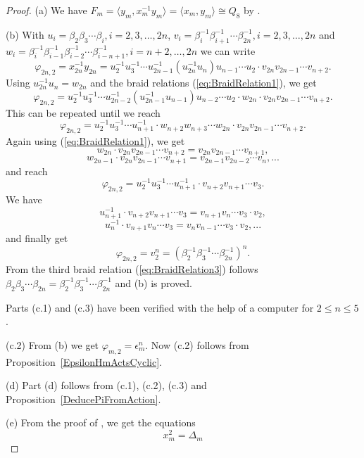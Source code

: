 \documentclass[12pt,a4paper]{article}
\numberwithin{equation}{section}
\numberwithin{table}{section}
\begin{document}
\begin{proof}
(a) We have $F_m = \langle y_m, x_m^{-1} y_m \rangle = \langle x_m, y_m \rangle \cong Q_8$ by \cite[Theorem (ii)]{RefGon2007}.
\par
\noindent
(b) With
$u_i = \beta_2 \beta_3 \cdots \beta_i, i=2,3,\dots, 2n$,
$v_i = \beta_i^{-1} \beta_{i+1}^{-1} \cdots \beta_{2n}^{-1}, i=2,3,\dots, 2n$
and
$w_i = \beta_i^{-1} \beta_{i-1}^{-1} \beta_{i-2}^{-1} \cdots \beta_{i-n+1}^{-1}, i=n+2,\dots, 2n$
we can write
$$\varphi_{2n,2} =x_{2n}^{-1} y_{2n} = u_2^{-1} u_3^{-1} \cdots u_{2n-1}^{-1} (u_{2n}^{-1} u_n) 
u_{n-1} \cdots u_2 \cdot
v_{2n} v_{2n-1} \cdots v_{n+2}.$$
Using $u_{2n}^{-1} u_n = w_{2n}$ and the braid relations (\ref{eq:BraidRelation1}), we get
$$\varphi_{2n,2} = u_2^{-1} u_3^{-1} \cdots u_{2n-2}^{-1} (u_{2n-1}^{-1} u_{n-1}) 
u_{n-2} \cdots u_2 \cdot
w_{2n} \cdot v_{2n} v_{2n-1} \cdots v_{n+2}.$$
This can be repeated until we reach
$$\varphi_{2n,2} = u_2^{-1} u_3^{-1} \cdots u_{n+1}^{-1} \cdot
w_{n+2} w_{n+3} \cdots w_{2n} \cdot
v_{2n} v_{2n-1} \cdots v_{n+2}.$$
Again using (\ref{eq:BraidRelation1}), we get
$$w_{2n} \cdot v_{2n} v_{2n-1} \cdots v_{n+2} = v_{2n} v_{2n-1} \cdots v_{n+1},$$
$$w_{2n-1} \cdot v_{2n} v_{2n-1} \cdots v_{n+1} = v_{2n-1} v_{2n-2} \cdots v_{n}, ...$$
and reach
$$\varphi_{2n,2} = u_2^{-1} u_3^{-1} \cdots u_{n+1}^{-1} \cdot v_{n+2} v_{n+1} \cdots v_3.$$
We have
$$u_{n+1}^{-1} \cdot v_{n+2} v_{n+1} \cdots v_3 = v_{n+1} v_n \cdots v_ 3 \cdot v_2,$$
$$u_n^{-1} \cdot v_{n+1} v_n \cdots v_3 = v_{n} v_{n-1} \cdots v_3 \cdot v_2, ...$$
and finally get
$$\varphi_{2n,2} = v_2^n = (\beta_2^{-1} \beta_3^{-1} \cdots \beta_{2n}^{-1})^n.$$
From the third braid relation (\ref{eq:BraidRelation3}) follows
$\beta_2 \beta_3 \cdots \beta_{2n} = \beta_2^{-1} \beta_3^{-1} \cdots \beta_{2n}^{-1}$
and (b) is proved.
\par
\noindent
Parts (c.1) and (c.3) have been verified with the help of a computer for $2 \leq n \leq 5$.
\par
\noindent
(c.2) From (b) we get $\varphi_{m,2} = \epsilon_m^n$. Now (c.2) follows from Proposition~\ref{EpsilonHmActsCyclic}.
\par
\noindent
(d) Part (d) follows from (c.1), (c.2), (c.3) and Proposition~\ref{DeducePiFromAction}.
\par
\noindent
(e) From the proof of \cite[Theorem (ii)]{RefGon2007}, we get the equations
\begin{equation} 
\label{eq:xm2EqualsDeltam}
x_m^2 = \Delta_m
\end{equation}
\begin{equation} 

\end{equation}
\end{proof}
\end{document}

